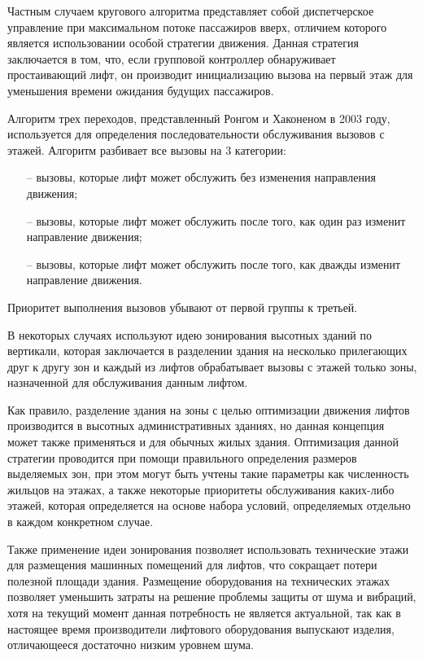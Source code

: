 	Частным случаем кругового алгоритма представляет собой диспетчерское управление
		при максимальном потоке пассажиров вверх, отличием которого является использовании
		особой стратегии движения. Данная стратегия заключается в том, что,
		если групповой контроллер обнаруживает простаивающий лифт,
		он производит инициализацию вызова на первый этаж для уменьшения времени ожидания будущих пассажиров.

	Алгоритм трех переходов, представленный Ронгом и Хаконеном в 2003 году,
		используется для определения последовательности обслуживания вызовов с этажей.
		Алгоритм разбивает все вызовы на 3 категории:
		\begin{itemize}
			\item[--] вызовы, которые лифт может обслужить без изменения направления движения;
			\item[--] вызовы, которые лифт может обслужить после того, как один раз изменит направление движения;
			\item[--] вызовы, которые лифт может обслужить после того, как дважды изменит направление движения.
		\end{itemize}
	
	Приоритет выполнения вызовов убывают от первой группы к третьей.
	
	В некоторых случаях используют идею зонирования высотных зданий по вертикали,
		которая заключается в разделении здания на несколько прилегающих друг к другу зон
		и каждый из лифтов обрабатывает вызовы с этажей только зоны, назначенной для обслуживания данным лифтом.

	Как правило, разделение здания на зоны с целью оптимизации движения
		лифтов производится в высотных административных зданиях,
		но данная концепция может также применяться и для обычных жилых здания.
		Оптимизация данной стратегии проводится при помощи правильного определения размеров выделяемых зон,
		при этом могут быть учтены такие параметры как численность жильцов на этажах,
		а также некоторые приоритеты обслуживания каких-либо этажей,
		которая определяется на основе набора условий, определяемых отдельно в каждом конкретном случае.

	Также применение идеи зонирования позволяет использовать технические этажи
		для размещения машинных помещений для лифтов, что сокращает потери полезной площади здания.
		Размещение оборудования на технических этажах позволяет уменьшить
		затраты на решение проблемы защиты от шума и вибраций,
		хотя на текущий момент данная потребность не является актуальной,
		так как в настоящее время производители лифтового оборудования выпускают изделия,
		отличающееся достаточно низким уровнем шума.

